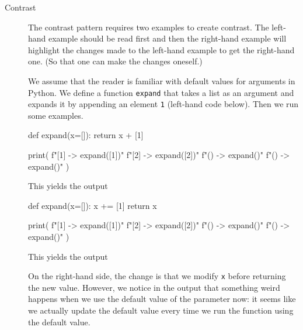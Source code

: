 \begin{description}
  \item[Contrast] The contrast pattern requires two examples to create 
    contrast.
    The left-hand example should be read first and then the right-hand 
    example will highlight the changes made to the left-hand example to get 
    the right-hand one.
    (So that one can make the changes oneself.)

    We assume that the reader is familiar with default values for arguments in 
    Python.
    We define a function \texttt{expand} that takes a list as an 
    argument and expands it by appending an element \texttt{1} 
    (left-hand code below).
    Then we run some examples.

    \begin{minipage}[t]{0.45\columnwidth}
      \begin{pyblock}[default1]
def expand(x=[]):
  return x + [1]


print(
  f"[1] -> {expand([1])}\n"
  f"[2] -> {expand([2])}\n"
  f"()  -> {expand()}\n"
  f"()  -> {expand()}\n"
)
      \end{pyblock}
      \vspace{0.5em}
      This yields the output
      \vspace{0.5em}
      \printpythontex[verbatim]
    \end{minipage}
    \hfill
    \begin{minipage}[t]{0.45\columnwidth}
      \begin{pyblock}[default2][highlightlines={2-3}]
def expand(x=[]):
  x += [1]
  return x

print(
  f"[1] -> {expand([1])}\n"
  f"[2] -> {expand([2])}\n"
  f"()  -> {expand()}\n"
  f"()  -> {expand()}\n"
)
      \end{pyblock}

      \vspace{0.5em}
      This yields the output
      \vspace{0.5em}
      \printpythontex[verbatim][highlightlines={4}]
    \end{minipage}

    On the right-hand side, the change is that we modify \texttt{x} 
    before returning the new value.
    However, we notice in the output that something weird happens when we use 
    the default value of the parameter now:
    it seems like we actually update the default value every time we run the 
    function using the default value.


\end{description}
